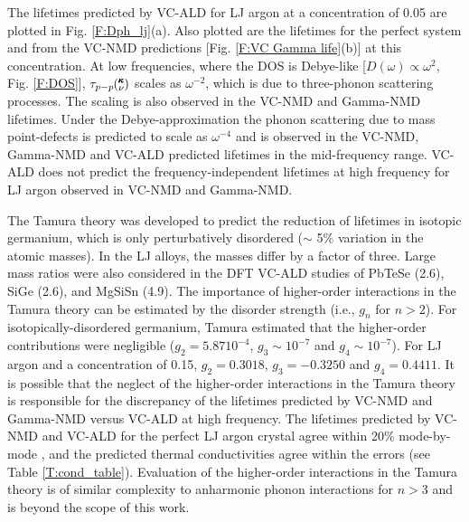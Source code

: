 \documentclass[aps,prb,onecolumn,preprint,footinbib,superscriptaddress,amsmath,amssymb,floatfix]{revtex4}
\newcommand{\kv}{\mspace{-4.0mu}\left(\mspace{-8.0mu}
\begin{smallmatrix}&\pmb{\kappa} \\&\nu\end{smallmatrix}
\mspace{-3.0mu}\right)}
\begin{document}
The lifetimes predicted by VC-ALD for LJ argon at a concentration 
of 0.05 are plotted in Fig. \ref{F:Dph_lj}(a).   
Also plotted are the lifetimes for the perfect system and from the 
VC-NMD predictions [Fig. \ref{F:VC Gamma life}(b)] at this 
concentration. At low frequencies, 
where the DOS is Debye-like 
[$D(\omega) \propto \omega^{2}$, Fig. \ref{F:DOS}], 
$\tau_{p-p}\kv$ scales as $\omega^{-2}$, which is due 
to three-phonon scattering processes.
\cite{maradudin_scattering_1962}  
The scaling is also observed in the VC-NMD and Gamma-NMD lifetimes. 
Under the Debye-approximation  
the phonon scattering due to mass point-defects 
is predicted to scale as $\omega^{-4}$ and is observed 
in the VC-NMD, Gamma-NMD and VC-ALD predicted lifetimes in the 
mid-frequency range. 
VC-ALD does not predict the frequency-independent lifetimes 
at high frequency for LJ argon observed in VC-NMD and Gamma-NMD. 

The Tamura theory was developed to predict the reduction of lifetimes 
in isotopic germanium, which is only perturbatively disordered 
($\sim$ 5$\%$ variation in the atomic masses). In the LJ alloys, the 
masses differ by a factor of three. Large mass ratios were also 
considered in the DFT VC-ALD studies of PbTeSe\cite{tian_phonon_2012} 
(2.6), SiGe\cite{garg_role_2011} (2.6), 
and MgSiSn\cite{li_thermal_2012} (4.9). 
The importance of higher-order interactions in 
the Tamura theory can be estimated by the disorder strength 
(i.e., $g_n$ for $n > 2$).\cite{tamura_isotope_1983} 
For isotopically-disordered germanium, Tamura estimated that the 
higher-order contributions were negligible ($g_2 = 5.87 10^{-4}$, 
$g_3 \sim 10^{-7}$ and $g_4 \sim 10^{-7}$).\cite{tamura_isotope_1983} 
For LJ argon and a concentration of 0.15,  
$g_2 = 0.3018$, $g_3 = -0.3250$ and $g_4 = 0.4411$. 
It is possible that the neglect of the higher-order interactions 
in the Tamura theory is responsible for the 
discrepancy of the lifetimes predicted by VC-NMD and Gamma-NMD 
versus VC-ALD at high frequency. The lifetimes predicted by 
VC-NMD and VC-ALD for the perfect LJ argon crystal agree 
within 20$\%$ mode-by-mode , and the 
predicted thermal conductivities agree within the errors (see 
Table \ref{T:cond_table}).  Evaluation of the 
higher-order interactions in the Tamura theory is of similar 
complexity to anharmonic phonon interactions for $n>3$ 
and is beyond the scope of this work.\cite{ecsedy_thermal_1977,
turney_predicting_2009-1} 
\end{document}
